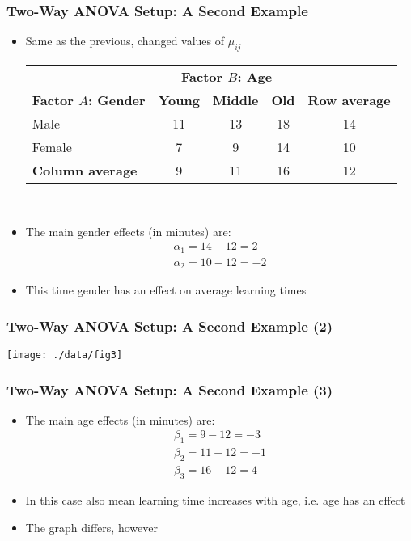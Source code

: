 \documentclass[10pt]{beamer}
\theoremstyle{definition}
\begin{document}
\begin{frame}[fragile]
\frametitle{Two-Way ANOVA Setup: A Second Example}
\begin{itemize}
	\item Same as the previous, changed values of $\mu_{ij}$
	\bigskip\\
	\begin{tabular}{l|ccc|c}
		\toprule
		& \multicolumn{3}{c|}{\textbf{Factor $B$: Age}}\\
		\cline{2-4}
		\textbf{Factor $A$: Gender} & \textbf{Young} & \textbf{Middle} & \textbf{Old} & \textbf{Row average}\\ 
		\midrule
		Male & 11 & 13 & 18 & 14\\
		Female & 7 & 9 & 14 & 10\\
		\midrule
		\textbf{Column average} & 9 & 11 & 16 & 12\\
		\bottomrule
	\end{tabular}
	\bigskip\\
	\item The main gender effects (in minutes) are:
	\[
		\begin{array}{lcl}
			\alpha_{1} = 14 - 12 = 2\\
			\alpha_{2} = 10 - 12 = -2
		\end{array}
	\]
	\item This time gender has an effect on average learning times
\end{itemize}
\end{frame}

\begin{frame}[fragile]
\frametitle{Two-Way ANOVA Setup: A Second Example (2)}
\centerline{\texttt{[image: ./data/fig3]}}
\end{frame}

\begin{frame}[fragile]
\frametitle{Two-Way ANOVA Setup: A Second Example (3)}
\begin{itemize}
	\item The main age effects (in minutes) are:
	\[
		\begin{array}{lcl}
			\beta_{1} = 9 - 12 = -3\\
			\beta_{2} = 11 - 12 = -1\\
			\beta_{3} = 16 - 12 = 4
		\end{array}
	\]
	\item In this case also mean learning time increases with age, i.e. age has an effect
	\item The graph differs, however
\end{itemize}
\end{frame}
\end{document}
